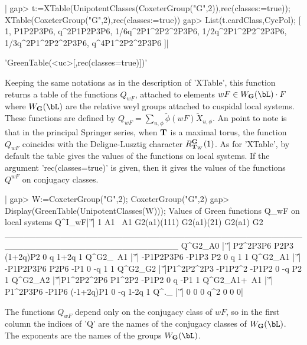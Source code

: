 |   gap> t:=XTable(UnipotentClasses(CoxeterGroup("G",2)),rec(classes:=true));
   XTable(CoxeterGroup("G",2),rec(classes:=true))
   gap> List(t.cardClass,CycPol);
   [ 1, P1P2P3P6, q^2P1P2P3P6, 1/6q^2P1^2P2^2P3P6, 1/2q^2P1^2P2^2P3P6,
     1/3q^2P1^2P2^2P3P6, q^4P1^2P2^2P3P6 ]|


'GreenTable(<uc>[,rec(classes\:=true)])'

Keeping the same notations as in the description of 'XTable', this function
returns  a table  of the  functions $Q_{wF}$,  attached to  elements $wF\in
W_\bG(\bL)\cdot F$ where $W_\bG(\bL)$ are the relative weyl groups attached
to cuspidal local systems. These functions are defined by
$Q_{wF}=\sum_{u,\phi}  \tilde\phi(wF) \tilde X_{u,\phi}$.  An point to note
is  that in the principal  Springer series, when ${\bf T}$  is a maximal torus,
the   function  $Q_{wF}$  coincides   with  the  Deligne-Lusztig  character
$R^{\bf G}_{{\bf T}_W}(1)$.  As for 'XTable', by default the table gives the values
of the functions on local systems. If the argument 'rec(classes\:=true)' is
given,  then it  gives the  values of  the functions  $Q^{wF}$ on conjugacy
classes.

|   gap> W:=CoxeterGroup("G",2);
   CoxeterGroup("G",2)
   gap> Display(GreenTable(UnipotentClasses(W)));
   Values of Green functions Q_wF on local systems
   Q^I_wF\class |'\|'|         1      A1       ~A1 G2(a1)(111) G2(a1)(21) G2(a1) G2
   ____________________________________________________________________________
   Q^G2_A0      |'\|'|  P2^2P3P6    P2P3  (1+2q)P2           0          q   1+2q  1
   Q^G2_~A1     |'\|'| -P1P2P3P6   -P1P3        P2           0          q      1  1
   Q^G2_A1      |'\|'| -P1P2P3P6    P2P6       -P1           0         -q      1  1
   Q^G2_G2      |'\|'|P1^2P2^2P3 -P1P2^2     -P1P2           0         -q     P2  1
   Q^G2_A2      |'\|'|P1^2P2^2P6  P1^2P2     -P1P2           0          q    -P1  1
   Q^G2_A1+~A1  |'\|'|  P1^2P3P6   -P1P6 (-1+2q)P1           0         -q   1-2q  1
   Q^._         |'\|'|         0       0         0         q^2          0      0  0|

The  functions $Q_{wF}$ depend only  on the conjugacy class  of $wF$, so in
the  first column the indices of 'Q' are the names of the conjugacy classes
of $W_\bG(\bL)$. The exponents are the names of the groups $W_\bG(\bL)$.

